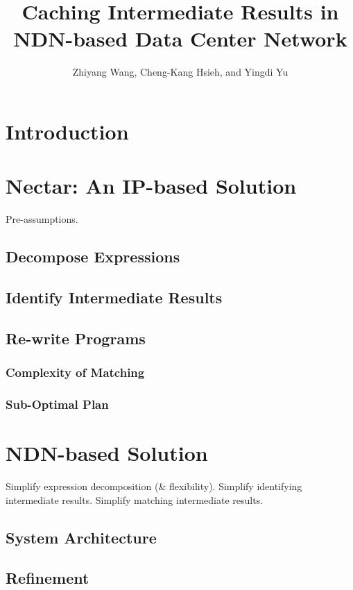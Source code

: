 \documentclass[journal]{IEEEtran}
\begin{document}
\title{Caching Intermediate Results in NDN-based Data Center Network}

\author{Zhiyang Wang,
  Cheng-Kang Hsieh,
  and Yingdi Yu}

\maketitle

\section{Introduction}
\section{Nectar: An IP-based Solution}
Pre-assumptions.
\subsection{Decompose Expressions}
\subsection{Identify Intermediate Results}
\subsection{Re-write Programs}
\subsubsection{Complexity of Matching}
\subsubsection{Sub-Optimal Plan}
\section{NDN-based Solution}
Simplify expression decomposition (\& flexibility).
Simplify identifying intermediate results.
Simplify matching intermediate results.
\subsection{System Architecture}
\subsection{Refinement}
\end{document}
